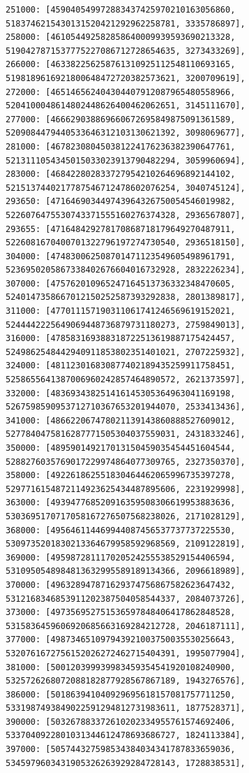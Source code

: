 \documentclass[11pt,a4paper]{article}
\numberwithin{equation}{section}
\theoremstyle{definition}
\theoremstyle{remark}
\begin{document}
\begin{lstlisting}
251000: [459040549972883437425970210163056860, 5183746215430131520421292962258781, 3335786897],
258000: [461054492582858640009939593690213328, 5190427871537775227086712728654635, 3273433269],
266000: [463382256258761310925112548110693165, 5198189616921800648472720382573621, 3200709619],
272000: [465146562404304407912087965480558966, 5204100048614802448626400462062651, 3145111670],
277000: [466629038869660672695849875091361589, 5209084479440533646312103130621392, 3098069677],
281000: [467823080450381224176236382390647761, 5213111054345015033023913790482294, 3059960694],
283000: [468422802833727954210264696892144102, 5215137440217787546712478602076254, 3040745124],
293650: [471646903449743964326750054546019982, 5226076475530743371555160276374328, 2936567807],
293655: [471648429278170868718179649270487911, 5226081670400701322796197274730540, 2936518150],
304000: [474830062508701471123549605498961791, 5236950205867338402676604016732928, 2832226234],
307000: [475762010965247164513736332348470605, 5240147358667012150252587393292838, 2801389817],
311000: [477011157190311061741246569619152021, 5244442225649069448736879731180273, 2759849013],
316000: [478583169388318722513619887175424457, 5249862548442940911853802351401021, 2707225932],
324000: [481123016830877402189435259911758451, 5258655641387006960242857464890572, 2621373597],
332000: [483693438251416145305364963041169198, 5267598590953712710367653201944070, 2533413436],
341000: [486622067478021139143860888527609012, 5277840475816287771505304037559031, 2431833246],
350000: [489590149217013150459035454451604544, 5288276035769017229974864077309765, 2327350370],
358000: [492261862551830464462065996735397278, 5297716154872114923625434487895606, 2231929998],
363000: [493947768520916359508306619953883636, 5303695170717058167276507568238026, 2171028129],
368000: [495646114469944087456537737737225530, 5309735201830213364679958592968569, 2109122819],
369000: [495987281117020524255538529154406594, 5310950548984813632995589189134366, 2096618989],
370000: [496328947871629374756867582623647432, 5312168346853911202387504058544337, 2084073726],
373000: [497356952751536597848406417862848528, 5315836459606920685663169284212728, 2046187111],
377000: [498734651097943921003750035530256643, 5320761672756152026272462715404391, 1995077904],
381000: [500120399939983459354541920108240900, 5325726268072088182877928567867189, 1943276576],
386000: [501863941040929695618157081757711250, 5331987493849022591294812731983611, 1877528371],
390000: [503267883372610202334955761574692406, 5337040922801031344612478693686727, 1824113384],
397000: [505744327598534384034341787833659036, 5345979603431905326263929284728143, 1728838531],

\end{lstlisting}
\end{document}
